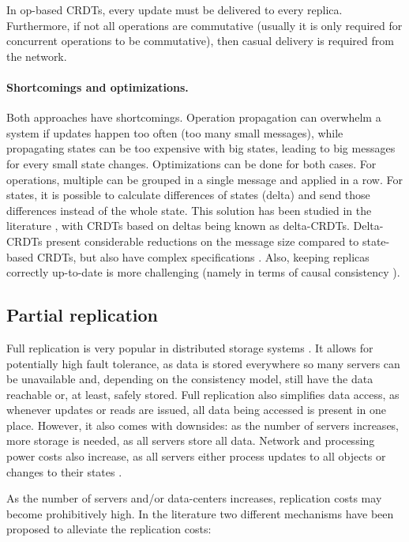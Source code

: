 In op-based CRDTs, every update must be delivered to every replica.
Furthermore, if not all operations are commutative (usually it is only required for concurrent operations to be commutative), then casual delivery is required from the network.

\paragraph{Shortcomings and optimizations.}
Both approaches have shortcomings.
Operation propagation can overwhelm a system if updates happen too often (too many small messages), while propagating states can be too expensive with big states, leading to big messages for every small state changes.
Optimizations can be done for both cases.
For operations, multiple can be grouped in a single message and applied in a row.
For states, it is possible to calculate differences of states (delta) and send those differences instead of the whole state.
This solution has been studied in the literature \cite{deltaAlmeida, deltaVan}, with CRDTs based on deltas being known as delta-CRDTs. Delta-CRDTs present considerable reductions on the message size compared to state-based CRDTs, but also have complex specifications \cite{deltaAlmeida}. Also, keeping replicas correctly up-to-date is more challenging (namely in terms of causal consistency \cite{deltaAlmeida}).

\subsection{Partial replication}
\label{subsec:partial}

Full replication is very popular in distributed storage systems \cite{sipre}. 
It allows for potentially high fault tolerance, as data is stored everywhere so many servers can be unavailable and, depending on the consistency model, still have the data reachable or, at least, safely stored.
Full replication also simplifies data access, as whenever updates or reads are issued, all data being accessed is present in one place.
However, it also comes with downsides: as the number of servers increases, more storage is needed, as all servers store all data.
Network and processing power costs also increase, as all servers either process updates to all objects or changes to their states \cite{sipre}.

As the number of servers and/or data-centers increases, replication costs may become prohibitively high.
In the literature two different mechanisms have been proposed to alleviate the replication costs:

